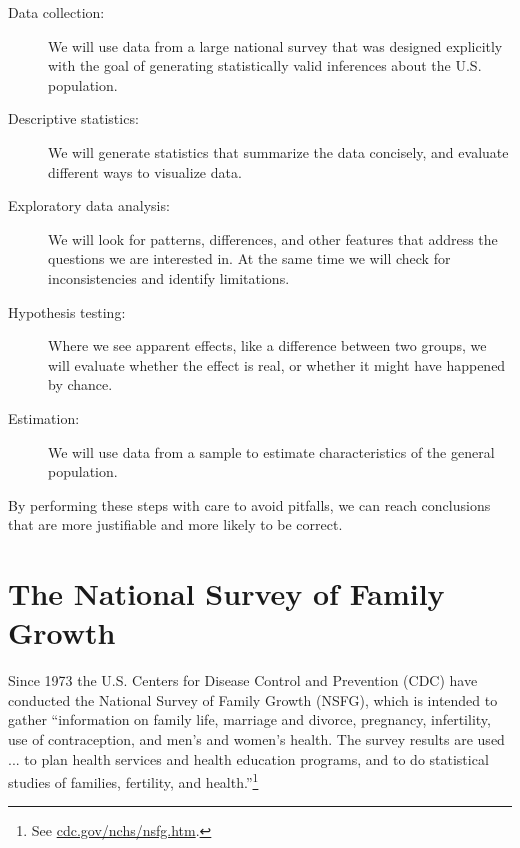 \documentclass[12pt]{book}
\begin{document}
\begin{description}

\item[Data collection:] We will use data from a large national survey
  that was designed explicitly with the goal of generating
  statistically valid inferences about the U.S. population.


\item[Descriptive statistics:] We will generate statistics that
  summarize the data concisely, and evaluate different ways to
  visualize data.


\item[Exploratory data analysis:] We will look for
  patterns, differences, and other features that address the questions
  we are interested in.  At the same time we will check for
  inconsistencies and identify limitations.


\item[Hypothesis testing:] Where we see apparent effects, like a
  difference between two groups, we will evaluate whether the effect
  is real, or whether it might have happened by chance.


\item[Estimation:] We will use data from a sample to estimate
  characteristics of the general population.


\end{description}

By performing these steps with care to avoid pitfalls, we can
reach conclusions that are more justifiable and more likely to be
correct.


\section{The National Survey of Family Growth}
\label{nsfg}

Since 1973 the U.S. Centers for Disease Control and Prevention (CDC)
have conducted the National Survey of Family Growth (NSFG),
which is intended to gather ``information on family life, marriage and
divorce, pregnancy, infertility, use of contraception, and men's and
women's health. The survey results are used ... to plan health services and
health education programs, and to do statistical studies of families,
fertility, and health.''\footnote{See
  \url{cdc.gov/nchs/nsfg.htm}.}
\end{document}
